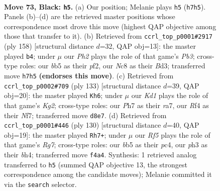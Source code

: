 \documentclass[11pt]{article}
\begin{document}
\begin{figure}[p]\centering
\begin{subfigure}{0.46\textwidth}\centering
\resizebox{\linewidth}{!}{%
\newchessgame
\chessboard[
  setfen={1Rnk4/7p/P7/1BP5/5r2/2p4P/2P1K1P1/8 b - - 10 73},
  showmover=false,
  pgfstyle=straightmove, color=movearrow, markmove={h7-h5}
]}
\caption{}
\end{subfigure}\hfill
\begin{subfigure}{0.46\textwidth}\centering
\resizebox{\linewidth}{!}{%
\newchessgame
\chessboard[
  setfen={8/Pb4p1/3k3p/7P/8/1P1B1r2/3K1p2/2R5 w - - 3 80},
  showmover=false,
  pgfstyle=straightmove, color=movearrow, markmove={b3-b4}
]}
\caption{}
\end{subfigure}
\\[4pt]
\begin{subfigure}{0.46\textwidth}\centering
\resizebox{\linewidth}{!}{%
\newchessgame
\chessboard[
  setfen={8/R4nk1/4p3/5p1P/5P2/N5P1/5K2/r7 b - - 2 67},
  showmover=false,
  pgfstyle=straightmove, color=movearrow, markmove={g7-h6}
]}
\caption{}
\end{subfigure}\hfill
\begin{subfigure}{0.46\textwidth}\centering
\resizebox{\linewidth}{!}{%
\newchessgame
\chessboard[
  setfen={8/6R1/3P4/4p2k/2p1Pp1b/5P1P/8/2r2NK1 w - - 0 66},
  showmover=false,
  pgfstyle=straightmove, color=movearrow, markmove={g7-h7}
]}
\caption{}
\end{subfigure}
\caption{\textbf{Move 73, Black: \texttt{h5}.} (a) Our position; Melanie plays \texttt{h5} (\texttt{h7h5}). Panels (b)--(d) are the retrieved master positions whose correspondence most drove this move (highest QAP objective among those that transfer to it). (b) Retrieved from \texttt{ccrl\_top\_p0001\#2917} (ply 158) [structural distance $d$=32, QAP obj=13]: the master played \texttt{b4}; under $\mu$ our \emph{Ph2} plays the role of that game's \emph{Pb3}; cross-type roles: our \emph{b}b5 as their \emph{p}f2, our \emph{N}c8 as their \emph{B}d3; transferred move \texttt{h7h5} \textbf{(endorses this move)}. (c) Retrieved from \texttt{ccrl\_top\_p0002\#709} (ply 133) [structural distance $d$=39, QAP obj=20]: the master played \texttt{Kh6}; under $\mu$ our \emph{Kd1} plays the role of that game's \emph{Kg2}; cross-type roles: our \emph{P}h7 as their \emph{r}a7, our \emph{R}f4 as their \emph{N}f7; transferred move \texttt{d8e7}. (d) Retrieved from \texttt{ccrl\_top\_p0001\#446} (ply 130) [structural distance $d$=40, QAP obj=19]: the master played \texttt{Rh7+}; under $\mu$ our \emph{Rf5} plays the role of that game's \emph{Rg7}; cross-type roles: our \emph{b}b5 as their \emph{p}c4, our \emph{p}h3 as their \emph{b}h4; transferred move \texttt{f4a4}. Synthesis: 1 retrieved analog transferred to \texttt{h5} (summed QAP objective 13, the strongest correspondence among the candidate moves); Melanie committed it via the \texttt{search} selector.}
\label{fig:thought-m145}
\end{figure}
\end{document}
